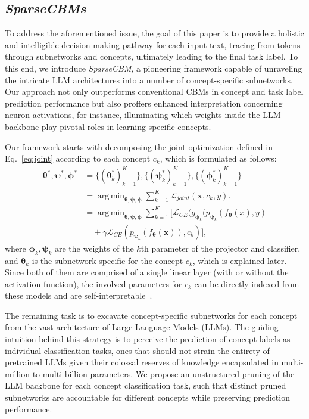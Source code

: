\documentclass[letterpaper]{article} %
\DeclareMathOperator*{\argmin}{arg\,min}
\begin{document}
\subsection{\textit{SparseCBMs}}
To address the aforementioned issue, the goal of this paper is to provide a holistic and intelligible decision-making pathway for each input text, tracing from tokens through subnetworks and concepts, ultimately leading to the final task label.
To this end, we introduce \textit{SparseCBM}, a pioneering framework capable of unraveling the intricate LLM architectures into a number of concept-specific subnetworks. Our approach not only outperforms conventional CBMs in concept and task label prediction performance but also proffers enhanced interpretation concerning neuron activations, for instance, illuminating which weights inside the LLM backbone play pivotal roles in learning specific concepts.

Our framework starts with decomposing the joint optimization defined in Eq.~\eqref{eq:joint} according to each concept $c_k$, which is formulated as follows:
\begin{equation}\label{eq:decompose}
\begin{aligned}
    \bm{\theta}^{\ast}, \bm{\psi}^{\ast}, \bm{\phi}^{\ast} &= \{(\bm\theta^{\ast}_k)_{k=1}^{K}\}, \{(\bm\psi^{\ast}_k)_{k=1}^{K}\}, \{(\bm\phi^{\ast}_k)_{k=1}^{K}\} \\ &= \argmin_{\bm\theta, \bm\psi, \bm\phi} \sum_{k=1}^K \mathcal{L}_{joint}(\bm{x}, c_k, y). \\
    &= \argmin_{\bm\theta, \bm\psi, \bm\phi} \sum_{k=1}^K [\mathcal{L}_{CE} (g_{\bm{\phi}_k}(p_{\bm{\psi}_k}(f_{\bm{\theta}}(x),y) \\ &\quad+ \gamma \mathcal{L}_{CE} (p_{\bm{\psi}_k}(f_{\bm{\theta}}(\bm{x})),c_k)],
\end{aligned}
\end{equation}
where $\bm{\phi}_k, \bm{\psi}_k$ are the weights of the $k$th parameter of the projector and classifier, and $\bm{\theta}_k$ is the subnetwork specific for the concept $c_k$, which is explained later. Since both of them are comprised of a single linear layer (with or without the activation function), the involved parameters for $c_k$ can be directly indexed from these models and are self-interpretable~\cite{koh2020concept,tan2023cbm}.

The remaining task is to excavate concept-specific subnetworks for each concept from the vast architecture of Large Language Models (LLMs). The guiding intuition behind this strategy is to perceive the prediction of concept labels as individual classification tasks, ones that should not strain the entirety of pretrained LLMs given their colossal reserves of knowledge encapsulated in multi-million to multi-billion parameters. We propose an unstructured pruning of the LLM backbone for each concept classification task, such that distinct pruned subnetworks are accountable for different concepts while preserving prediction performance.
\end{document}
